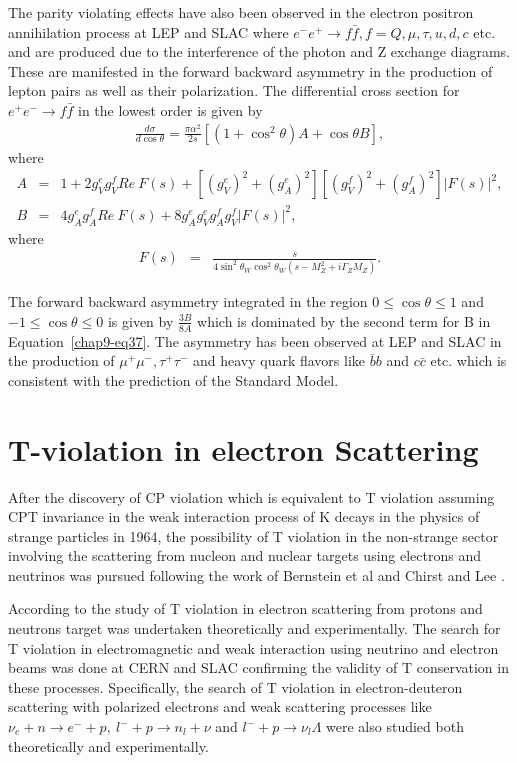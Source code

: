 The parity violating effects have also been observed in the electron positron annihilation process at  LEP and SLAC where $e^-e^+\rightarrow f\bar{f}, f=Q,\mu,\tau,u,d,c$ etc. and  are produced due to the interference of the photon and Z exchange diagrams. These are manifested in the forward backward asymmetry in the production of lepton pairs as well as their polarization. The differential cross section for $e^+e^-\rightarrow f\bar{f}$ in the lowest order is given by \cite{key30}
\begin{eqnarray}
 \frac{d \sigma}{d \cos\theta}=\frac{\pi \alpha^{2}}{2s}\left[ (1+ \cos^2 \theta )A + \cos\theta  B\right],  \label{chap9-eq37}
\end{eqnarray}
where
\begin{eqnarray}
 A&=& 1+2g_{V}^{e}g_{V}^{f}Re~F(s)+[(g_{V}^{e})^2+(g_{A}^{e})^2][(g_{V}^{f})^2+(g_{A}^{f})^2]|F(s)|^2 ,\nonumber \\
 B&=&4g_{A}^{e}g_{A}^{f} Re~F(s)+ 8g_{A}^{e}g_{V}^{e}g_{A}^{f}g_{V}^{f}|F(s)|^2, \label{chap9-eq38}
 \end{eqnarray}
where
\begin{eqnarray}
F(s)&=&\frac{s}{4\sin^2\theta_{W}\cos^2\theta_{W}(s-M_{Z}^2+i\Gamma_{Z}M_{Z})}. \label{chap9-eq39}
\end{eqnarray}

 The forward backward asymmetry integrated in the region $0\leq \cos\theta\leq 1$   and $-1\leq\cos\theta\leq 0$ is given by $\frac{3B}{8A}$ which is dominated by the second term for B in Equation~\ref{chap9-eq37}. The asymmetry has been observed at LEP and SLAC in the production of $\mu^+\mu^-,\tau^+\tau^-$ and heavy quark flavors like $\bar{b}b$ and $c\bar{c}$ etc. which is consistent with the prediction of the Standard Model. 
 
\section{T-violation in electron Scattering}\label{chap9-sec4}

After the discovery of CP violation which is equivalent to T violation assuming CPT invariance in the weak interaction process of K decays in the physics of strange particles in 1964, the possibility of T violation in the non-strange sector involving the scattering from nucleon and nuclear targets using electrons and neutrinos was pursued following the work of Bernstein et al \cite{key31} and Chirst and Lee \cite{key32}.

According to the study of T violation in electron scattering from protons and neutrons target was undertaken theoretically and experimentally. The search for T violation in electromagnetic and weak interaction using neutrino and  electron beams was done at CERN and SLAC confirming the validity of  T conservation in these processes. Specifically, the search of T violation in electron-deuteron scattering with polarized electrons and weak scattering processes like $\nu_e+n\rightarrow e^-+p, ~ l^-+p\rightarrow n_l+\nu$ and $ l^-+p\rightarrow \nu_l \Lambda$ were also studied both theoretically and experimentally. 

